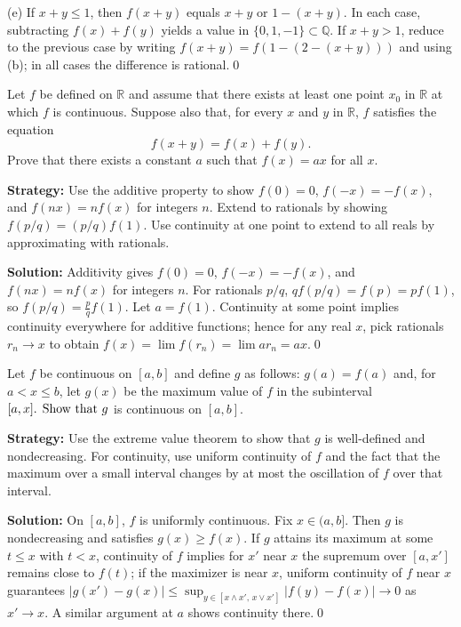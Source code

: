 (e) If $x+y\le 1$, then $f(x+y)$ equals $x+y$ or $1-(x+y)$. In each case, subtracting $f(x)+f(y)$ yields a value in $\{0,1,-1\}\subset \mathbb{Q}$. If $x+y>1$, reduce to the previous case by writing $f(x+y)=f(1-(2-(x+y)))$ and using (b); in all cases the difference is rational.\qed



\begin{problembox}
Let \( f \) be defined on \( \mathbb{R} \) and assume that there exists at least one point \( x_0 \) in \( \mathbb{R} \) at which \( f \) is continuous. Suppose also that, for every \( x \) and \( y \) in \( \mathbb{R} \), \( f \) satisfies the equation
\[f(x + y) = f(x) + f(y).\]
Prove that there exists a constant \( a \) such that \( f(x) = ax \) for all \( x \).
\end{problembox}

\noindent\textbf{Strategy:} Use the additive property to show $f(0) = 0$, $f(-x) = -f(x)$, and $f(nx) = nf(x)$ for integers $n$. Extend to rationals by showing $f(p/q) = (p/q)f(1)$. Use continuity at one point to extend to all reals by approximating with rationals.

\bigskip\noindent\textbf{Solution:}
Additivity gives $f(0)=0$, $f(-x)=-f(x)$, and $f(nx)=nf(x)$ for integers $n$. For rationals $p/q$, $qf(p/q)=f(p)=pf(1)$, so $f(p/q)=\tfrac{p}{q}f(1)$. Let $a=f(1)$. Continuity at some point implies continuity everywhere for additive functions; hence for any real $x$, pick rationals $r_n\to x$ to obtain $f(x)=\lim f(r_n)=\lim ar_n=ax$.\qed



\begin{problembox}
Let \( f \) be continuous on \([a, b]\) and define \( g \) as follows: \( g(a) = f(a) \) and, for \( a < x \leq b \), let \( g(x) \) be the maximum value of \( f \) in the subinterval \([a, x]$. Show that \( g \) is continuous on \([a, b]\).
\end{problembox}

\noindent\textbf{Strategy:} Use the extreme value theorem to show that $g$ is well-defined and nondecreasing. For continuity, use uniform continuity of $f$ and the fact that the maximum over a small interval changes by at most the oscillation of $f$ over that interval.

\bigskip\noindent\textbf{Solution:}
On $[a,b]$, $f$ is uniformly continuous. Fix $x\in(a,b]$. Then $g$ is nondecreasing and satisfies $g(x)\ge f(x)$. If $g$ attains its maximum at some $t\le x$ with $t<x$, continuity of $f$ implies for $x'$ near $x$ the supremum over $[a,x']$ remains close to $f(t)$; if the maximizer is near $x$, uniform continuity of $f$ near $x$ guarantees $|g(x')-g(x)|\le \sup_{y\in[x\wedge x',\,x\vee x']}|f(y)-f(x)|\to 0$ as $x'\to x$. A similar argument at $a$ shows continuity there.\qed



